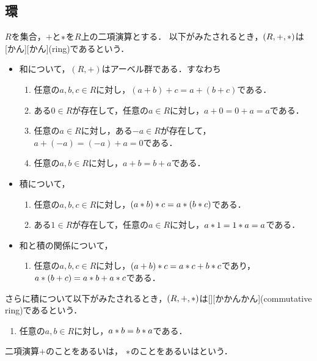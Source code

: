 \documentclass[../sotsu.tex]{subfiles}
\begin{document}
\subsection{環}

\begin{definition}[環]
    \label{dfn:ring}
    $R$を集合，$+$と$\mathbin{\ast}$を$R$上の二項演算とする．
    以下がみたされるとき，$(R, +, \mathbin{\ast})$は[かん][かん](ring)であるという．
    \begin{itemize}
        \item 和について，$(R, +)$はアーベル群である．すなわち
        \begin{enumerate}
            \item \label{ring:sum-associative} 任意の$a, b, c \in R$に対し，$(a + b) + c = a + (b + c)$である．
            \item \label{ring:sum-zero} ある$0 \in R$が存在して，任意の$a \in R$に対し，$a + 0 = 0 + a = a$である．
            \item \label{ring:sum-opposite} 任意の$a \in R$に対し，ある$-a \in R$が存在して，$a + (-a) = (-a) + a = 0$である．
            \item \label{ring:sum-commutative} 任意の$a, b \in R$に対し，$a + b = b + a$である．
        \end{enumerate}
        \item 積について，
        \begin{enumerate}[resume]
            \item \label{ring:prod-associative} 任意の$a, b, c \in R$に対し，$(a \mathbin{\ast} b) \mathbin{\ast} c = a \mathbin{\ast} (b \mathbin{\ast} c)$である．
            \item \label{ring:prod-one} ある$1 \in R$が存在して，任意の$a \in R$に対し，$a \mathbin{\ast} 1 = 1 \mathbin{\ast} a = a$である．
        \end{enumerate}
        \item 和と積の関係について，
        \begin{enumerate}[resume]
            \item \label{ring:distributive} 任意の$a, b, c \in R$に対し，$(a + b) \mathbin{\ast} c = a \mathbin{\ast} c + b \mathbin{\ast} c$であり，$a \mathbin{\ast} (b + c) = a \mathbin{\ast} b + a \mathbin{\ast} c$である．
        \end{enumerate}
    \end{itemize}
    さらに積について以下がみたされるとき，$(R, +, \mathbin{\ast})$は[][かかんかん](commutative ring)であるという．
    \begin{enumerate}[start=9]
        \item 任意の$a, b \in R$に対し，$a \mathbin{\ast} b = b \mathbin{\ast} a$である．
    \end{enumerate}
    二項演算$+$のことをあるいは，
    $\mathbin{\ast}$のことをあるいはという．
\end{definition}
\end{document}

